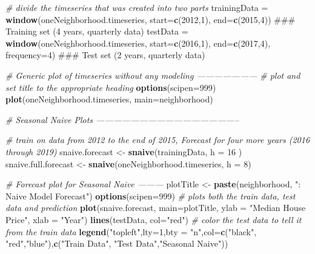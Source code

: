 \documentclass[]{article}
\newenvironment{Shaded}{\begin{snugshade}}{\end{snugshade}}
\newcommand{\KeywordTok}[1]{\textcolor[rgb]{0.13,0.29,0.53}{\textbf{#1}}}
\newcommand{\DataTypeTok}[1]{\textcolor[rgb]{0.13,0.29,0.53}{#1}}
\newcommand{\DecValTok}[1]{\textcolor[rgb]{0.00,0.00,0.81}{#1}}
\newcommand{\StringTok}[1]{\textcolor[rgb]{0.31,0.60,0.02}{#1}}
\newcommand{\CommentTok}[1]{\textcolor[rgb]{0.56,0.35,0.01}{\textit{#1}}}
\newcommand{\NormalTok}[1]{#1}
\begin{document}
\begin{Shaded}
\begin{Highlighting}[]
{  \CommentTok{# divide the timeseries that was created into two parts}
\NormalTok{  trainingData =}\StringTok{ }\KeywordTok{window}\NormalTok{(oneNeighborhood.timeseries, }\DataTypeTok{start=}\KeywordTok{c}\NormalTok{(}\DecValTok{2012}\NormalTok{,}\DecValTok{1}\NormalTok{), }\DataTypeTok{end=}\KeywordTok{c}\NormalTok{(}\DecValTok{2015}\NormalTok{,}\DecValTok{4}\NormalTok{)) ### Training set (4 years, quarterly data)}
\NormalTok{  testData =}\StringTok{ }\KeywordTok{window}\NormalTok{(oneNeighborhood.timeseries, }\DataTypeTok{start=}\KeywordTok{c}\NormalTok{(}\DecValTok{2016}\NormalTok{,}\DecValTok{1}\NormalTok{), }\DataTypeTok{end=}\KeywordTok{c}\NormalTok{(}\DecValTok{2017}\NormalTok{,}\DecValTok{4}\NormalTok{), }\DataTypeTok{frequency=}\DecValTok{4}\NormalTok{)  ### Test set    (2 years, quarterly data)}
  
  \CommentTok{# Generic plot of timeseries without any modeling ---------------------}
  \CommentTok{# plot and set title to the appropriate heading}
  \KeywordTok{options}\NormalTok{(}\DataTypeTok{scipen=}\DecValTok{999}\NormalTok{)}
  \KeywordTok{plot}\NormalTok{(oneNeighborhood.timeseries, }\DataTypeTok{main=}\NormalTok{neighborhood)}
  
  
  \CommentTok{# Seasonal Naive Plots --------------------------------------------------}
  
  \CommentTok{# train on data from 2012 to the end of 2015, Forecast for four more years (2016 through 2019)}
\NormalTok{  snaive.forecast <-}\StringTok{ }\KeywordTok{snaive}\NormalTok{(trainingData, }\DataTypeTok{h =} \DecValTok{16}\NormalTok{ )}
\NormalTok{  snaive.full.forecast <-}\StringTok{ }\KeywordTok{snaive}\NormalTok{(oneNeighborhood.timeseries, }\DataTypeTok{h =} \DecValTok{8}\NormalTok{)}

  \CommentTok{# Forecast plot for Seasonal Naive ---------}
\NormalTok{  plotTitle <-}\StringTok{ }\KeywordTok{paste}\NormalTok{(neighborhood, }\StringTok{": Naive Model Forecast"}\NormalTok{)}
  \KeywordTok{options}\NormalTok{(}\DataTypeTok{scipen=}\DecValTok{999}\NormalTok{)}
  \CommentTok{# plots both the train data, test data and prediction}
  \KeywordTok{plot}\NormalTok{(snaive.forecast, }\DataTypeTok{main=}\NormalTok{plotTitle, }\DataTypeTok{ylab =} \StringTok{"Median House Price"}\NormalTok{, }\DataTypeTok{xlab =} \StringTok{"Year"}\NormalTok{) }
  \KeywordTok{lines}\NormalTok{(testData, }\DataTypeTok{col=}\StringTok{"red"}\NormalTok{) }\CommentTok{# color the test data to tell it from the train data}
  \KeywordTok{legend}\NormalTok{(}\StringTok{"topleft"}\NormalTok{,}\DataTypeTok{lty=}\DecValTok{1}\NormalTok{,}\DataTypeTok{bty =} \StringTok{"n"}\NormalTok{,}\DataTypeTok{col=}\KeywordTok{c}\NormalTok{(}\StringTok{"black"}\NormalTok{, }\StringTok{"red"}\NormalTok{,}\StringTok{"blue"}\NormalTok{),}\KeywordTok{c}\NormalTok{(}\StringTok{"Train Data"}\NormalTok{, }\StringTok{"Test Data"}\NormalTok{,}\StringTok{"Seasonal Naive"}\NormalTok{))}

}
\end{Highlighting}
\end{Shaded}
\end{document}
